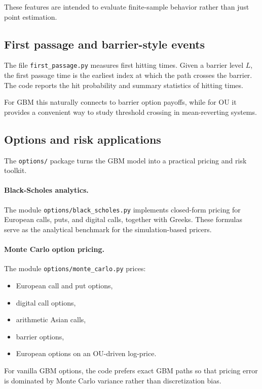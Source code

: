 \documentclass[11pt]{article}
\begin{document}
These features are intended to evaluate finite-sample behavior rather than just point estimation.

\subsection{First passage and barrier-style events}

The file \texttt{first\_passage.py} measures first hitting times. Given a barrier level $L$, the first passage time is the earliest index at which the path crosses the barrier. The code reports the hit probability and summary statistics of hitting times.

For GBM this naturally connects to barrier option payoffs, while for OU it provides a convenient way to study threshold crossing in mean-reverting systems.

\subsection{Options and risk applications}

The \texttt{options/} package turns the GBM model into a practical pricing and risk toolkit.

\paragraph{Black-Scholes analytics.}
The module \texttt{options/black\_scholes.py} implements closed-form pricing for European calls, puts, and digital calls, together with Greeks. These formulas serve as the analytical benchmark for the simulation-based pricers.

\paragraph{Monte Carlo option pricing.}
The module \texttt{options/monte\_carlo.py} prices:
\begin{itemize}[leftmargin=1.2em]
  \item European call and put options,
  \item digital call options,
  \item arithmetic Asian calls,
  \item barrier options,
  \item European options on an OU-driven log-price.
\end{itemize}
For vanilla GBM options, the code prefers exact GBM paths so that pricing error is dominated by Monte Carlo variance rather than discretization bias.
\end{document}
